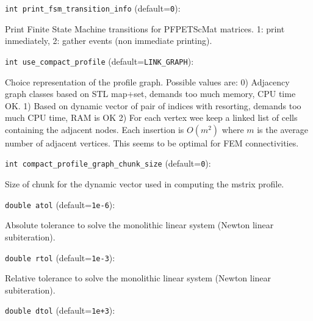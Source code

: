 \item\verb+int print_fsm_transition_info+ {\rm(default=\verb|0|)}:

Print Finite State Machine transitions for PFPETScMat matrices.
1: print inmediately, 2: gather events (non immediate printing). 

\item\verb+int use_compact_profile+ {\rm(default=\verb|LINK_GRAPH|)}:

Choice representation of the profile graph. Possible values are:
0) Adjacency graph classes
based on STL map+set, demands too much memory, CPU time OK.
1) Based on dynamic vector of pair of indices with resorting,
demands too much CPU time, RAM is OK
2) For each vertex wee keep a linked list of cells containing the
adjacent nodes. Each insertion is $O(m^2)$ where $m$ is the average
number of adjacent vertices. This seems to be optimal for
FEM connectivities.

\item\verb+int compact_profile_graph_chunk_size+ {\rm(default=\verb|0|)}:

Size of chunk for the dynamic vector used in computing the
mstrix profile. 

\item\verb+double atol+ {\rm(default=\verb|1e-6|)}:

Absolute tolerance to solve the monolithic linear
system (Newton linear subiteration).

\item\verb+double rtol+ {\rm(default=\verb|1e-3|)}:

Relative tolerance to solve the monolithic linear
system (Newton linear subiteration).

\item\verb+double dtol+ {\rm(default=\verb|1e+3|)}:

